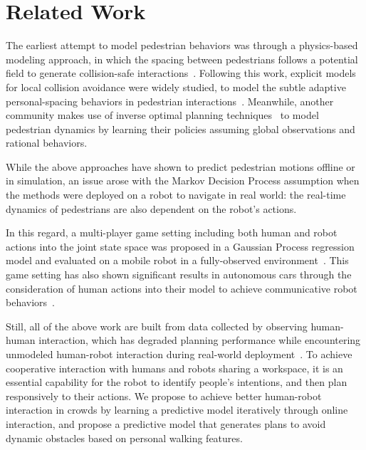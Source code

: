 \documentclass[conference]{IEEEtran}
\begin{document}
\section{Related Work}
\label{sec:related}
\vspace{-0.4em}
The earliest attempt to model pedestrian behaviors was through a physics-based 
modeling approach, in which the spacing between pedestrians follows a 
potential field to generate collision-safe 
interactions~\cite{helbing1995social}. Following this work, explicit models 
for local collision avoidance were widely studied, to model the subtle 
adaptive personal-spacing behaviors in pedestrian 
interactions~\cite{papadakis2014adaptive}. Meanwhile, another community 
makes use of inverse optimal planning 
techniques~\cite{ziebart2009planning,henry2010learning,vasquez2014inverse} to 
model pedestrian dynamics by learning their policies assuming global observations and 
rational behaviors.

While the above approaches have shown to predict pedestrian motions 
offline or in simulation, an issue arose with the Markov Decision 
Process assumption when the methods were deployed on a robot to navigate in real world:
the real-time dynamics of pedestrians are also dependent on the robot's 
actions. 

In this regard, a multi-player game setting including both human and robot actions into the joint state space was proposed in a Gaussian Process regression model and evaluated on a mobile robot in a fully-observed environment~\cite{trautman2010unfreezing}. This game setting has also shown significant results in autonomous cars through the consideration of human actions into their model to achieve communicative robot behaviors~\cite{sadigh2016planning}.

Still, all of the above work are built from data collected by observing human-human 
interaction, which has degraded planning performance while encountering unmodeled 
human-robot interaction during real-world 
deployment~\cite{trautman2015robot, pfeiffer2016predicting}. To achieve 
cooperative interaction with humans and robots sharing a workspace, it is 
an essential capability for the robot to identify people's 
intentions, and then plan responsively to their actions. We propose to achieve 
better human-robot interaction in crowds by learning a predictive model 
iteratively through online interaction, and propose a predictive model 
that generates plans to avoid dynamic obstacles based on personal walking features. 
\end{document}
